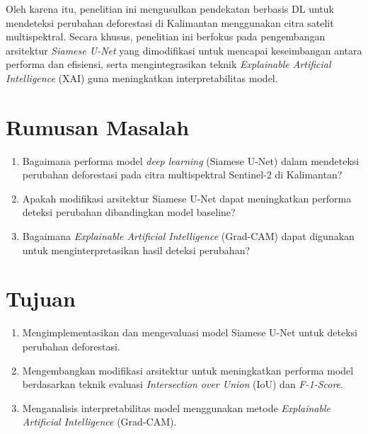 Oleh karena itu, penelitian ini mengusulkan pendekatan berbasis DL untuk mendeteksi perubahan deforestasi di Kalimantan menggunakan citra satelit multispektral. Secara khusus, penelitian ini berfokus pada pengembangan arsitektur \textit{Siamese U-Net} yang dimodifikasi untuk mencapai keseimbangan antara performa dan efisiensi, serta mengintegrasikan teknik \textit{Explainable Artificial Intelligence} (XAI) guna meningkatkan interpretabilitas model. 


\section{Rumusan Masalah}

\begin{enumerate}
    \item Bagaimana performa model \textit{deep learning} (Siamese U-Net) dalam mendeteksi perubahan deforestasi pada citra multispektral Sentinel-2 di Kalimantan?
    \item Apakah modifikasi arsitektur Siamese U-Net dapat meningkatkan performa deteksi perubahan dibandingkan model baseline?
    \item Bagaimana \textit{Explainable Artificial Intelligence} (Grad-CAM) dapat digunakan untuk menginterpretasikan hasil deteksi perubahan?
\end{enumerate}


\section{Tujuan}

\begin{enumerate}
    \item Mengimplementasikan dan mengevaluasi model Siamese U-Net untuk deteksi perubahan deforestasi.
    \item Mengembangkan modifikasi arsitektur untuk meningkatkan performa model berdasarkan teknik evaluasi \textit{Intersection over Union} (IoU) dan \textit{F-1-Score}.
    \item Menganalisis interpretabilitas model menggunakan metode \textit{Explainable Artificial Intelligence} (Grad-CAM).
\end{enumerate}


